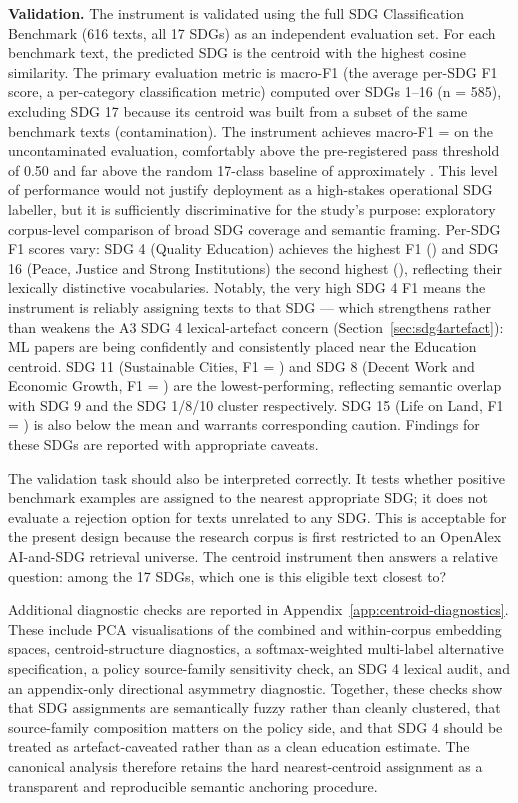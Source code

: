 \documentclass[12pt,a4paper]{article}
\begin{document}
\textbf{Validation.} The instrument is validated using the full SDG Classification Benchmark (616 texts, all 17 SDGs) as an independent evaluation set. For each benchmark text, the predicted SDG is the centroid with the highest cosine similarity. The primary evaluation metric is macro-F1 (the average per-SDG F1 score, a per-category classification metric) computed over SDGs 1--16 (n = 585), excluding SDG 17 because its centroid was built from a subset of the same benchmark texts (contamination). The instrument achieves macro-F1 = \MacroFOne{} on the uncontaminated evaluation, comfortably above the pre-registered pass threshold of 0.50 and far above the random 17-class baseline of approximately \RandomBaselineSeventeenClass. This level of performance would not justify deployment as a high-stakes operational SDG labeller, but it is sufficiently discriminative for the study's purpose: exploratory corpus-level comparison of broad SDG coverage and semantic framing. Per-SDG F1 scores vary: SDG 4 (Quality Education) achieves the highest F1 (\FiSdgFour) and SDG 16 (Peace, Justice and Strong Institutions) the second highest (\FiSdgSixteen), reflecting their lexically distinctive vocabularies. Notably, the very high SDG 4 F1 means the instrument is reliably assigning texts to that SDG --- which strengthens rather than weakens the A3 SDG 4 lexical-artefact concern (Section~\ref{sec:sdg4artefact}): ML papers are being confidently and consistently placed near the Education centroid. SDG 11 (Sustainable Cities, F1 = \FiSdgEleven) and SDG 8 (Decent Work and Economic Growth, F1 = \FiSdgEight) are the lowest-performing, reflecting semantic overlap with SDG 9 and the SDG 1/8/10 cluster respectively. SDG 15 (Life on Land, F1 = \FiSdgFifteen) is also below the mean and warrants corresponding caution. Findings for these SDGs are reported with appropriate caveats.

The validation task should also be interpreted correctly. It tests whether positive benchmark examples are assigned to the nearest appropriate SDG; it does not evaluate a rejection option for texts unrelated to any SDG. This is acceptable for the present design because the research corpus is first restricted to an OpenAlex AI-and-SDG retrieval universe. The centroid instrument then answers a relative question: among the 17 SDGs, which one is this eligible text closest to?

Additional diagnostic checks are reported in Appendix~\ref{app:centroid-diagnostics}. These include PCA visualisations of the combined and within-corpus embedding spaces, centroid-structure diagnostics, a softmax-weighted multi-label alternative specification, a policy source-family sensitivity check, an SDG 4 lexical audit, and an appendix-only directional asymmetry diagnostic. Together, these checks show that SDG assignments are semantically fuzzy rather than cleanly clustered, that source-family composition matters on the policy side, and that SDG 4 should be treated as artefact-caveated rather than as a clean education estimate. The canonical analysis therefore retains the hard nearest-centroid assignment as a transparent and reproducible semantic anchoring procedure.
\end{document}
